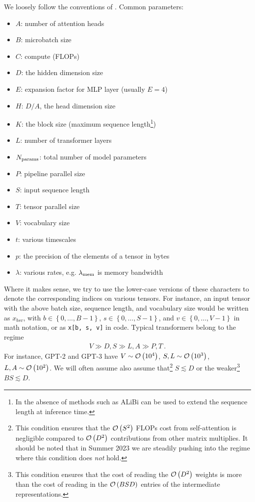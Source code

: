 \documentclass[11pt]{article}
\begin{document}
We loosely follow the conventions of \cite{korthikanti2022reducing}.  Common parameters:
\begin{itemize}
	\item $ A $: number of attention heads
	\item $ B $: microbatch size
	\item $ C $: compute (FLOPs)
	\item $ D $: the hidden dimension size
	\item $ E $: expansion factor for MLP layer (usually $ E=4 $)
	\item $ H $: $ D/A $, the head dimension size
	\item $ K $: the block size (maximum sequence length\footnote{In the absence of methods such as         ALiBi \cite{ALiBi}  can be used to extend the sequence length at inference time.})
	\item $ L $: number of transformer layers
	\item $ N _{ {\rm params}  } $: total number of model parameters
	\item $ P $: pipeline parallel size
	\item $ S $: input sequence length
	\item $ T $: tensor parallel size
	\item $ V $: vocabulary size
	\item $ t $: various timescales
	\item $ p $: the precision of the elements of a tensor in bytes
	\item $ \lambda  $: various rates, e.g. $ \lambda _{ {\rm mem}  } $ is memory bandwidth
\end{itemize}
Where it makes sense, we try to use the lower-case versions of these characters to denote the
corresponding indices on various tensors. For instance, an input tensor with the above batch size,
sequence length, and vocabulary size would be written as $ x _{ bsv } $, with $ b \in \left \{ 0,
	\ldots, B - 1 \right \} $, $ s \in \left \{ 0, \ldots, S - 1\right \} $, and $  v \in \left \{ 0,
	\ldots, V -1\right \}$ in math notation, or as \texttt{x[b, s, v]} in code.  Typical
transformers belong to the regime
\begin{gather}
	V \gg D, S \gg L, A \gg P, T \ .  \label{app_eq_transformers_approxs}
\end{gather}
For instance, GPT-2 and GPT-3 \cite{gpt2radford2019language, gpt3brown2020language} have $ V \sim
	\mathcal{O} \left( 10 ^{ 4 } \right)  $, $ S, L \sim \mathcal{O} \left( 10 ^{ 3 } \right)  $, $ L, A \sim \mathcal{O}
	\left( 10 ^{ 2 } \right)  $. We will often assume also assume that\footnote{This condition ensures
	that the $ \mathcal{O} \left( S ^{ 2 } \right)  $ FLOPs cost from self-attention is negligible
	compared to $ \mathcal{O} \left( D ^{ 2 } \right)  $ contributions from other matrix multiplies.  It
	should be noted that in Summer 2023 we are steadily pushing into the regime where this condition
	does \textit{not}  hold.} $ S \lesssim D $ or the weaker\footnote{This condition ensures that the
	cost of reading the $ \mathcal{O} \left( D ^{ 2 } \right)  $ weights is more than the cost of reading in
	the $ \mathcal{O} \left( BSD \right)  $ entries of the intermediate representations.} $ BS \lesssim D $.
\end{document}
